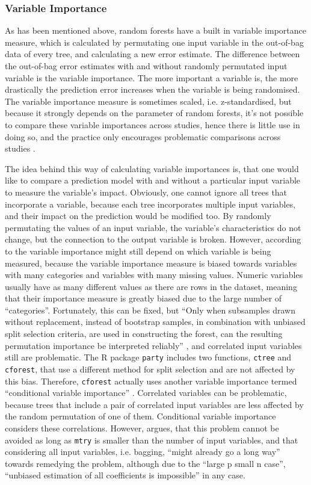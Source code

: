 \documentclass[a4paper,man,12pt,apacite,floatsintext,draftfirst]{apa6} %
\begin{document}
\subsubsection{Variable Importance}
As has been mentioned above, random forests have a built in variable
importance measure, which is calculated by permutating one input variable
in the out-of-bag data of every tree, and calculating a new error estimate.
The difference between the out-of-bag error estimates with and without
randomly permutated input variable is the variable importance.
The more important a variable is, the more drastically the prediction error
increases when the variable is being randomised.
The variable importance measure is sometimes scaled, i.e. z-standardised,
but because it strongly depends on the parameter of random forests,
it's not possible to compare these variable importances across studies,
hence there is little use in doing so, and the practice only encourages
problematic comparisons across studies \cite{strobl2009introduction}.

The idea behind this way of calculating variable importances is,
that one would like to compare a prediction model with and without a
particular input variable to measure the variable's impact.
Obviously, one cannot ignore all trees that incorporate a variable,
because each tree incorporates multiple input variables, and their impact
on the prediction would be modified too.
By randomly permutating the values of an input variable,
the variable's characteristics do not change, but the connection to the
output variable is broken.
However, according to  the variable importance might
still depend on which variable is being measured, because the
variable importance measure is biased towards variables with many categories
and variables with many missing values.
Numeric variables usually have as many different values as there are rows
in the dataset, meaning that their importance measure is greatly biased due
to the large number of “categories”.
Fortunately, this can be fixed, but “Only when subsamples drawn without
replacement, instead of bootstrap samples, in combination with unbiased
split selection criteria, are used in constructing the forest, can the
resulting permutation importance be interpreted reliably”
\cite{strobl2007bias}, and correlated input variables still are
problematic.
The R package \texttt{party} includes two functions, \texttt{ctree} and
\texttt{cforest}, that use a different method for split selection and are not
affected by this bias.
Therefore, \texttt{cforest} actually uses another variable importance termed
“conditional variable importance” \cite{strobl2008conditional}.
Correlated variables can be problematic, because trees that include a
pair of correlated input variables are less affected by the random
permutation of one of them.
Conditional variable importance considers these correlations.
However,  argues, that this problem cannot be avoided
as long as \texttt{mtry} is smaller than the number of input variables,
and that considering all input variables, i.e. bagging,
“might already go a long way” towards remedying the problem,
although due to the “large p small n case”, “unbiased estimation of all
coefficients is impossible” in any case.
\end{document}
